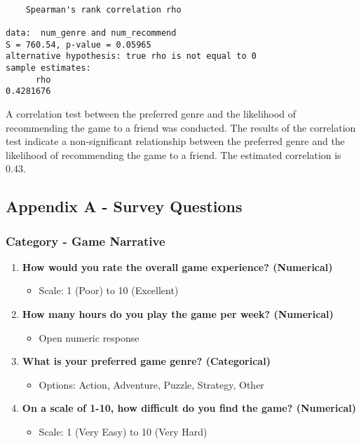 \documentclass[
  letterpaper,
  DIV=11,
  numbers=noendperiod]{scrartcl}
\providecommand{\tightlist}{%
  \setlength{\itemsep}{0pt}\setlength{\parskip}{0pt}}\usepackage{longtable,booktabs,array}
\begin{document}
\begin{verbatim}

    Spearman's rank correlation rho

data:  num_genre and num_recommend
S = 760.54, p-value = 0.05965
alternative hypothesis: true rho is not equal to 0
sample estimates:
      rho 
0.4281676 
\end{verbatim}

A correlation test between the preferred genre and the likelihood of
recommending the game to a friend was conducted. The results of the
correlation test indicate a non-significant relationship between the
preferred genre and the likelihood of recommending the game to a friend.
The estimated correlation is 0.43.

\subsection{Appendix A - Survey
Questions}\label{appendix-a---survey-questions}

\subsubsection{Category - Game
Narrative}\label{category---game-narrative}

\begin{enumerate}
\def\labelenumi{\arabic{enumi}.}
\tightlist
\item
  \textbf{How would you rate the overall game experience? (Numerical)}

  \begin{itemize}
  \tightlist
  \item
    Scale: 1 (Poor) to 10 (Excellent)
  \end{itemize}
\item
  \textbf{How many hours do you play the game per week? (Numerical)}

  \begin{itemize}
  \tightlist
  \item
    Open numeric response
  \end{itemize}
\item
  \textbf{What is your preferred game genre? (Categorical)}

  \begin{itemize}
  \tightlist
  \item
    Options: Action, Adventure, Puzzle, Strategy, Other
  \end{itemize}
\item
  \textbf{On a scale of 1-10, how difficult do you find the game?
  (Numerical)}

  \begin{itemize}
  \tightlist
  \item
    Scale: 1 (Very Easy) to 10 (Very Hard)
  \end{itemize}
\end{enumerate}
\end{document}
